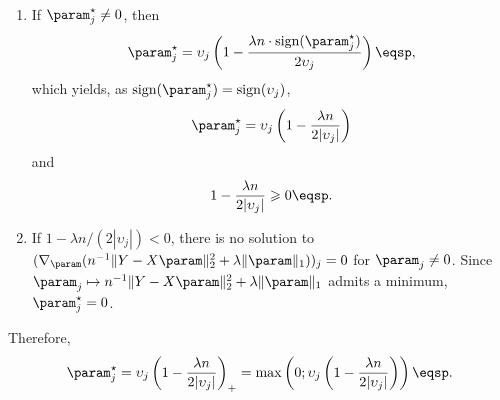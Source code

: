 \begin{enumerate}[-]
\item If $\param_j^{\star} \neq 0$, then
\[
\param_j^{\star} = \upsilon_j\left( 1 - \frac{\lambda n\cdot\textrm{sign}(\param_j^{\star})}{2 \upsilon_j}\right)\eqsp,
\]
which yields, as  $\textrm{sign}(\param_j^{\star}) = \textrm{sign}(\upsilon_j)$,
\[
\param_j^{\star} = \upsilon_j\left(1 - \frac{\lambda n }{2 |\upsilon_j|}\right)
\]
and
\[
1 - \frac{\lambda n }{2 |\upsilon_j|} \geqslant 0\eqsp.
\]
\item If $1 - \lambda n/(2 |\upsilon_j|)<0$, there is no solution to $(\nabla_\param ( n^{-1}\|Y - X\param\|_2^2 +  \lambda\|\param\|_1))_j=0$ for $\param_j \neq 0$.  Since $\param_j \mapsto  n^{-1}\|Y - X\param\|_2^2 + \lambda\|\param\|_1$ admits a minimum, $\param_j^{\star}=0$. 
\end{enumerate}
Therefore,
\[
\param_j^{\star} = \upsilon_j\left( 1 - \frac{\lambda n}{2 |\upsilon_j|}\right)_+ = \mathrm{max}\left(0;\upsilon_j\left( 1 - \frac{\lambda n}{2 |\upsilon_j|}\right)\right)\eqsp.
\]

